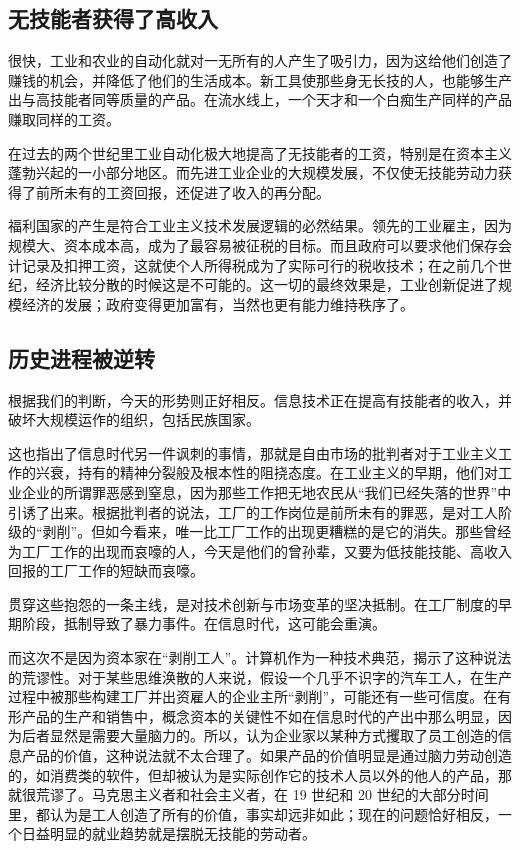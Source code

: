 \subsection{无技能者获得了高收入}
很快，工业和农业的自动化就对一无所有的人产生了吸引力，因为这给他们创造了赚钱的机会，并降低了他们的生活成本。新工具使那些身无长技的人，也能够生产出与高技能者同等质量的产品。在流水线上，一个天才和一个白痴生产同样的产品赚取同样的工资。

在过去的两个世纪里工业自动化极大地提高了无技能者的工资，特别是在资本主义蓬勃兴起的一小部分地区。而先进工业企业的大规模发展，不仅使无技能劳动力获得了前所未有的工资回报，还促进了收入的再分配。

福利国家的产生是符合工业主义技术发展逻辑的必然结果。领先的工业雇主，因为规模大、资本成本高，成为了最容易被征税的目标。而且政府可以要求他们保存会计记录及扣押工资，这就使个人所得税成为了实际可行的税收技术；在之前几个世纪，经济比较分散的时候这是不可能的。这一切的最终效果是，工业创新促进了规模经济的发展；政府变得更加富有，当然也更有能力维持秩序了。

\subsection{历史进程被逆转}
根据我们的判断，今天的形势则正好相反。信息技术正在提高有技能者的收入，并破坏大规模运作的组织，包括民族国家。

这也指出了信息时代另一件讽刺的事情，那就是自由市场的批判者对于工业主义工作的兴衰，持有的精神分裂般及根本性的阻挠态度。在工业主义的早期，他们对工业企业的所谓罪恶感到窒息，因为那些工作把无地农民从“我们已经失落的世界”中引诱了出来。根据批判者的说法，工厂的工作岗位是前所未有的罪恶，是对工人阶级的“剥削”。但如今看来，唯一比工厂工作的出现更糟糕的是它的消失。那些曾经为工厂工作的出现而哀嚎的人，今天是他们的曾孙辈，又要为低技能技能、高收入回报的工厂工作的短缺而哀嚎。

贯穿这些抱怨的一条主线，是对技术创新与市场变革的坚决抵制。在工厂制度的早期阶段，抵制导致了暴力事件。在信息时代，这可能会重演。

而这次不是因为资本家在“剥削工人”。计算机作为一种技术典范，揭示了这种说法的荒谬性。对于某些思维涣散的人来说，假设一个几乎不识字的汽车工人，在生产过程中被那些构建工厂并出资雇人的企业主所“剥削”，可能还有一些可信度。在有形产品的生产和销售中，概念资本的关键性不如在信息时代的产出中那么明显，因为后者显然是需要大量脑力的。所以，认为企业家以某种方式攫取了员工创造的信息产品的价值，这种说法就不太合理了。如果产品的价值明显是通过脑力劳动创造的，如消费类的软件，但却被认为是实际创作它的技术人员以外的他人的产品，那就很荒谬了。马克思主义者和社会主义者，在 19 世纪和 20 世纪的大部分时间里，都认为是工人创造了所有的价值，事实却远非如此；现在的问题恰好相反，一个日益明显的就业趋势就是摆脱无技能的劳动者。

